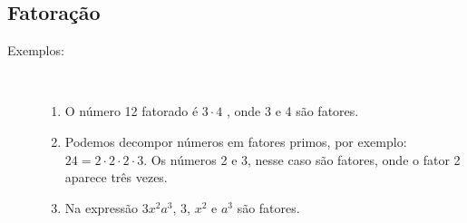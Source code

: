 \subsection{Fatoração}

\begin{center}\end{center}


\begin{description}
\item [Exemplos:] ~
\begin{enumerate}[label=\alph*)]
\item O número 12 fatorado é $3 \cdot 4$ , onde 3 e 4 são fatores.

\item Podemos decompor números em fatores primos, por exemplo: $24 = 2 \cdot2 \cdot 2 \cdot 3$. Os números 2 e 3, nesse caso são fatores, onde o fator 2 aparece três vezes.

\item Na expressão $3x^2a^3$, 3, $x^2$  e $a^3$ são fatores.
\end{enumerate}
\end{description}

